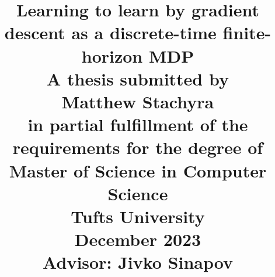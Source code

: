 \documentclass[12pt]{report}
\begin{document}
\title{
  {\Large \textbf{Learning to learn by gradient descent as a discrete-time finite-horizon MDP}}\\
  \vspace{2cm}
  {\normalsize A thesis submitted by}\\
  {\large Matthew Stachyra}\\
  {\normalsize in partial fulfillment of the requirements for the degree of}\\
  {\normalsize Master of Science in Computer Science}\\
  \vspace{2cm}
  {\normalsize Tufts University}\\
  {\normalsize December 2023}\\
  {\normalsize Advisor: Jivko Sinapov}
  \date{}
}

\maketitle











\cleardoublepage 
\printbibliography[title={Bibliography},heading=bibintoc]
\end{document}
